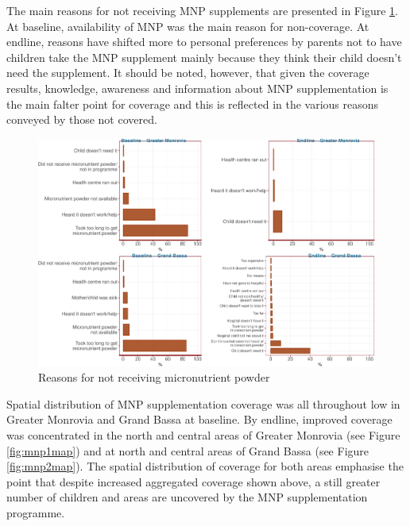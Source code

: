 \documentclass[12pt,a4paper]{article}
\begin{document}
The main reasons for not receiving MNP supplements are presented in Figure \ref{fig:mnp2plot}. At baseline, availability of MNP was the main reason for non-coverage. At endline, reasons have shifted more to personal preferences by parents not to have children take the MNP supplement mainly because they think their child doesn't need the supplement. It should be noted, however, that given the coverage results, knowledge, awareness and information about MNP supplementation is the main falter point for coverage and this is reflected in the various reasons conveyed by those not covered.

\begin{figure}[H]

{\centering \includegraphics{liberiaCoverageFinalReport_files/figure-latex/mnp2plot-1} 

}

\caption{Reasons for not receiving micronutrient powder}\label{fig:mnp2plot}
\end{figure}

Spatial distribution of MNP supplementation coverage was all throughout low in Greater Monrovia and Grand Bassa at baseline. By endline, improved coverage was concentrated in the north and central areas of Greater Monrovia (see Figure \ref{fig:mnp1map}) and at north and central areas of Grand Bassa (see Figure \ref{fig:mnp2map}). The spatial distribution of coverage for both areas emphasise the point that despite increased aggregated coverage shown above, a still greater number of children and areas are uncovered by the MNP supplementation programme.
\end{document}
